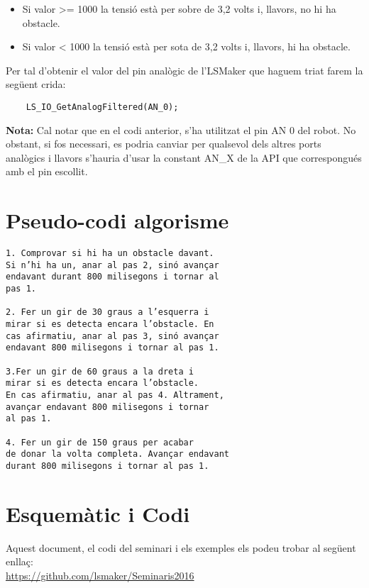 \documentclass[fleqn,10pt]{SelfArx} %
\begin{document}
\begin{itemize}

	\item Si valor >= 1000 la tensió està per sobre de 3,2 volts i, llavors, no hi ha obstacle.

	\item Si valor < 1000 la tensió està per sota de 3,2 volts i, llavors, hi ha obstacle.

\end{itemize}


\newpage
Per tal d'obtenir el valor del pin analògic de l'LSMaker que haguem triat farem la següent crida:

\begin{verbatim}
    LS_IO_GetAnalogFiltered(AN_0);
\end{verbatim}

\textbf{Nota:} Cal notar que en el codi anterior, s’ha utilitzat el pin
AN 0 del robot. No obstant, si fos necessari, es podria canviar
per qualsevol dels altres ports analògics i llavors s'hauria d'usar la constant AN\_X de la API que correspongués amb el pin escollit.

\section{Pseudo-codi algorisme}
\begin{verbatim}
1. Comprovar si hi ha un obstacle davant.
Si n’hi ha un, anar al pas 2, sinó avançar
endavant durant 800 milisegons i tornar al
pas 1.

2. Fer un gir de 30 graus a l’esquerra i
mirar si es detecta encara l’obstacle. En
cas afirmatiu, anar al pas 3, sinó avançar
endavant 800 milisegons i tornar al pas 1.

3.Fer un gir de 60 graus a la dreta i
mirar si es detecta encara l’obstacle.
En cas afirmatiu, anar al pas 4. Altrament,
avançar endavant 800 milisegons i tornar
al pas 1.

4. Fer un gir de 150 graus per acabar
de donar la volta completa. Avançar endavant
durant 800 milisegons i tornar al pas 1.
\end{verbatim}

\section{Esquemàtic i Codi}
Aquest document, el codi del seminari i els exemples els podeu trobar al següent enllaç:\\

\small{\url{https://github.com/lsmaker/Seminaris2016}}

\end{document}
